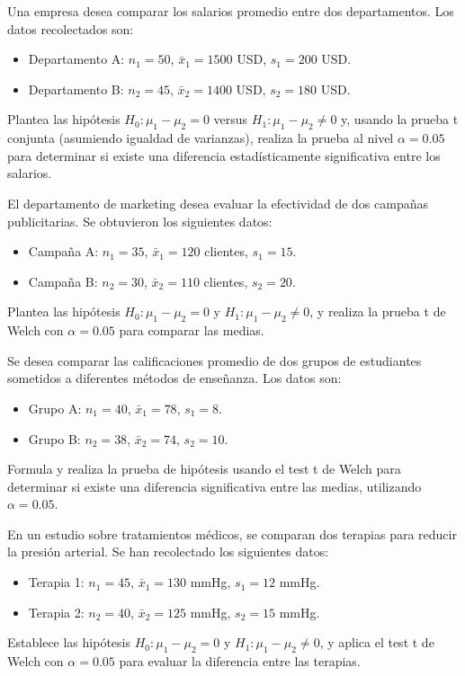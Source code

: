 \documentclass[addpoints,12pt]{exam}
\theoremstyle{plain}
\theoremstyle{remark}
\theoremstyle{definition}
\begin{document}
\begin{questions}
 \question   Una empresa desea comparar los salarios promedio entre dos departamentos. Los datos recolectados son:
    \begin{itemize}
        \item Departamento A: \( n_1 = 50 \), \(\bar{x}_1 = 1500\) USD, \( s_1 = 200\) USD.
        \item Departamento B: \( n_2 = 45 \), \(\bar{x}_2 = 1400\) USD, \( s_2 = 180\) USD.
    \end{itemize}
    Plantea las hipótesis \(H_0: \mu_1 - \mu_2 = 0\) versus \(H_1: \mu_1 - \mu_2 \neq 0\) y, usando la prueba t conjunta (asumiendo igualdad de varianzas), realiza la prueba al nivel \(\alpha = 0.05\) para determinar si existe una diferencia estadísticamente significativa entre los salarios.

 \question El departamento de marketing desea evaluar la efectividad de dos campañas publicitarias. Se obtuvieron los siguientes datos:
    \begin{itemize}
        \item Campaña A: \( n_1 = 35 \), \(\bar{x}_1 = 120\) clientes, \( s_1 = 15 \).
        \item Campaña B: \( n_2 = 30 \), \(\bar{x}_2 = 110\) clientes, \( s_2 = 20 \).
    \end{itemize}
    Plantea las hipótesis \(H_0: \mu_1 - \mu_2 = 0\) y \(H_1: \mu_1 - \mu_2 \neq 0\), y realiza la prueba t de Welch con \(\alpha = 0.05\) para comparar las medias.
    
 \question  Se desea comparar las calificaciones promedio de dos grupos de estudiantes sometidos a diferentes métodos de enseñanza. Los datos son:
    \begin{itemize}
        \item Grupo A: \( n_1 = 40 \), \(\bar{x}_1 = 78\), \( s_1 = 8 \).
        \item Grupo B: \( n_2 = 38 \), \(\bar{x}_2 = 74\), \( s_2 = 10 \).
    \end{itemize}
    Formula y realiza la prueba de hipótesis usando el test t de Welch para determinar si existe una diferencia significativa entre las medias, utilizando \(\alpha = 0.05\).
    
 \question  En un estudio sobre tratamientos médicos, se comparan dos terapias para reducir la presión arterial. Se han recolectado los siguientes datos:
    \begin{itemize}
        \item Terapia 1: \( n_1 = 45 \), \(\bar{x}_1 = 130\) mmHg, \( s_1 = 12 \) mmHg.
        \item Terapia 2: \( n_2 = 40 \), \(\bar{x}_2 = 125\) mmHg, \( s_2 = 15 \) mmHg.
    \end{itemize}
    Establece las hipótesis \(H_0: \mu_1 - \mu_2 = 0\) y \(H_1: \mu_1 - \mu_2 \neq 0\), y aplica el test t de Welch con \(\alpha = 0.05\) para evaluar la diferencia entre las terapias.
    

\end{questions}
\end{document}
